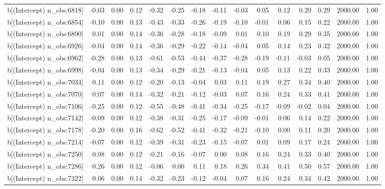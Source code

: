 \begin{table}[ht]
\begin{tabular}{rrrrrrrrrrrrrrr}
  b[(Intercept) n\_obs:6818] & -0.03 & 0.00 & 0.12 & -0.32 & -0.25 & -0.18 & -0.11 & -0.03 & 0.05 & 0.12 & 0.20 & 0.29 & 2000.00 & 1.00 \\ 
  b[(Intercept) n\_obs:6854] & -0.10 & 0.00 & 0.13 & -0.43 & -0.33 & -0.26 & -0.19 & -0.10 & -0.01 & 0.06 & 0.15 & 0.22 & 2000.00 & 1.00 \\ 
  b[(Intercept) n\_obs:6890] & 0.01 & 0.00 & 0.14 & -0.36 & -0.28 & -0.18 & -0.09 & 0.01 & 0.10 & 0.19 & 0.29 & 0.35 & 2000.00 & 1.00 \\ 
  b[(Intercept) n\_obs:6926] & -0.04 & 0.00 & 0.14 & -0.36 & -0.29 & -0.22 & -0.14 & -0.04 & 0.05 & 0.14 & 0.23 & 0.32 & 2000.00 & 1.00 \\ 
  b[(Intercept) n\_obs:6962] & -0.28 & 0.00 & 0.13 & -0.61 & -0.53 & -0.44 & -0.37 & -0.28 & -0.19 & -0.11 & -0.03 & 0.05 & 2000.00 & 1.00 \\ 
  b[(Intercept) n\_obs:6998] & -0.04 & 0.00 & 0.13 & -0.34 & -0.29 & -0.21 & -0.13 & -0.04 & 0.05 & 0.13 & 0.22 & 0.33 & 2000.00 & 1.00 \\ 
  b[(Intercept) n\_obs:7034] & 0.11 & 0.00 & 0.12 & -0.20 & -0.13 & -0.04 & 0.03 & 0.11 & 0.19 & 0.27 & 0.34 & 0.40 & 2000.00 & 1.00 \\ 
  b[(Intercept) n\_obs:7070] & 0.07 & 0.00 & 0.14 & -0.32 & -0.21 & -0.12 & -0.03 & 0.07 & 0.16 & 0.24 & 0.33 & 0.41 & 2000.00 & 1.00 \\ 
  b[(Intercept) n\_obs:7106] & -0.25 & 0.00 & 0.12 & -0.55 & -0.48 & -0.41 & -0.34 & -0.25 & -0.17 & -0.09 & -0.02 & 0.04 & 2000.00 & 1.00 \\ 
  b[(Intercept) n\_obs:7142] & -0.09 & 0.00 & 0.12 & -0.38 & -0.31 & -0.25 & -0.17 & -0.09 & -0.01 & 0.06 & 0.14 & 0.22 & 2000.00 & 1.00 \\ 
  b[(Intercept) n\_obs:7178] & -0.20 & 0.00 & 0.16 & -0.62 & -0.52 & -0.41 & -0.32 & -0.21 & -0.10 & 0.00 & 0.11 & 0.20 & 2000.00 & 1.00 \\ 
  b[(Intercept) n\_obs:7214] & -0.07 & 0.00 & 0.12 & -0.39 & -0.31 & -0.23 & -0.15 & -0.07 & 0.01 & 0.09 & 0.17 & 0.24 & 2000.00 & 1.00 \\ 
  b[(Intercept) n\_obs:7250] & 0.08 & 0.00 & 0.12 & -0.21 & -0.16 & -0.07 & 0.00 & 0.08 & 0.16 & 0.24 & 0.33 & 0.40 & 2000.00 & 1.00 \\ 
  b[(Intercept) n\_obs:7286] & 0.26 & 0.00 & 0.12 & -0.06 & 0.00 & 0.11 & 0.18 & 0.26 & 0.34 & 0.41 & 0.50 & 0.57 & 2000.00 & 1.00 \\ 
  b[(Intercept) n\_obs:7322] & 0.06 & 0.00 & 0.14 & -0.32 & -0.23 & -0.12 & -0.04 & 0.07 & 0.16 & 0.24 & 0.34 & 0.42 & 2000.00 & 1.00 \\ 

\end{tabular}
\end{table}
